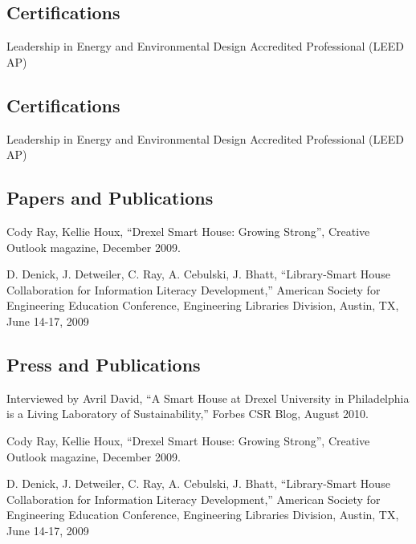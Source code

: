 \documentclass[margin]{res}
\begin{document}
\begin{resume}
\begin{educate}
\section{Certifications}
Leadership in Energy and Environmental Design Accredited Professional (LEED AP)
\end{educate}
\begin{general}
\section{Certifications}
Leadership in Energy and Environmental Design Accredited Professional (LEED AP)
\end{general}

\begin{educate}
\section{Papers and Publications}
\begin{list}{}{\leftmargin=1em} \itemsep -2pt %
\item Cody Ray, Kellie Houx, ``Drexel Smart House: Growing Strong'', Creative Outlook magazine, December 2009.
\item D. Denick, J. Detweiler, C. Ray, A. Cebulski, J. Bhatt, ``Library-Smart House Collaboration for Information Literacy Development,'' American Society for Engineering Education Conference, Engineering Libraries Division, Austin, TX, June 14-17, 2009
\end{list}
\end{educate}
\begin{general}
\section{Press and Publications}
\begin{list}{}{\leftmargin=1em} \itemsep -2pt %
\item Interviewed by Avril David, ``A Smart House at Drexel University in Philadelphia is a Living Laboratory of Sustainability,'' Forbes CSR Blog, August 2010.
\item Cody Ray, Kellie Houx, ``Drexel Smart House: Growing Strong'', Creative Outlook magazine, December 2009.
\item D. Denick, J. Detweiler, C. Ray, A. Cebulski, J. Bhatt, ``Library-Smart House Collaboration for Information Literacy Development,'' American Society for Engineering Education Conference, Engineering Libraries Division, Austin, TX, June 14-17, 2009
\end{list}
\end{general}


\end{resume}
\end{document}
